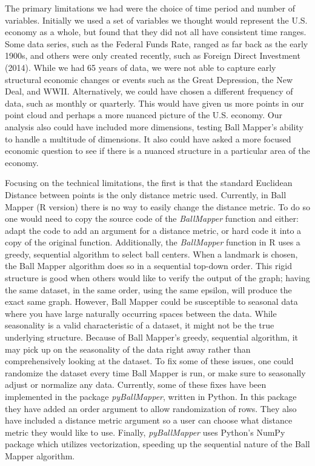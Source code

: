 \documentclass[10pt, letterpaper]{article}
\begin{document}
The primary limitations we had were the choice of time period and number
of variables. Initially we used a set of variables we thought would
represent the U.S. economy as a whole, but found that they did not all
have consistent time ranges. Some data series, such as the Federal Funds
Rate, ranged as far back as the early 1900s, and others were only
created recently, such as Foreign Direct Investment (2014). While we had
65 years of data, we were not able to capture early structural economic
changes or events such as the Great Depression, the New Deal, and WWII.
Alternatively, we could have chosen a different frequency of data, such
as monthly or quarterly. This would have given us more points in our
point cloud and perhaps a more nuanced picture of the U.S. economy. Our
analysis also could have included more dimensions, testing Ball Mapper's
ability to handle a multitude of dimensions. It also could have asked a
more focused economic question to see if there is a nuanced structure in
a particular area of the economy.

Focusing on the technical limitations, the first is that the standard
Euclidean Distance between points is the only distance metric used.
Currently, in Ball Mapper (R version) there is no way to easily change
the distance metric. To do so one would need to copy the source code of
the \emph{BallMapper} function and either: adapt the code to add an
argument for a distance metric, or hard code it into a copy of the
original function. Additionally, the \emph{BallMapper} function in R
uses a greedy, sequential algorithm to select ball centers. When a
landmark is chosen, the Ball Mapper algorithm does so in a sequential
top-down order. This rigid structure is good when others would like to
verify the output of the graph; having the same dataset, in the same
order, using the same epsilon, will produce the exact same graph.
However, Ball Mapper could be susceptible to seasonal data where you
have large naturally occurring spaces between the data. While
seasonality is a valid characteristic of a dataset, it might not be the
true underlying structure. Because of Ball Mapper's greedy, sequential
algorithm, it may pick up on the seasonality of the data right away
rather than comprehensively looking at the dataset. To fix some of these
issues, one could randomize the dataset every time Ball Mapper is run,
or make sure to seasonally adjust or normalize any data. Currently, some
of these fixes have been implemented in the package \emph{pyBallMapper},
written in Python. In this package they have added an order argument to
allow randomization of rows. They also have included a distance metric
argument so a user can choose what distance metric they would like to
use. Finally, \emph{pyBallMapper} uses Python's NumPy package which
utilizes vectorization, speeding up the sequential nature of the Ball
Mapper algorithm.
\end{document}
